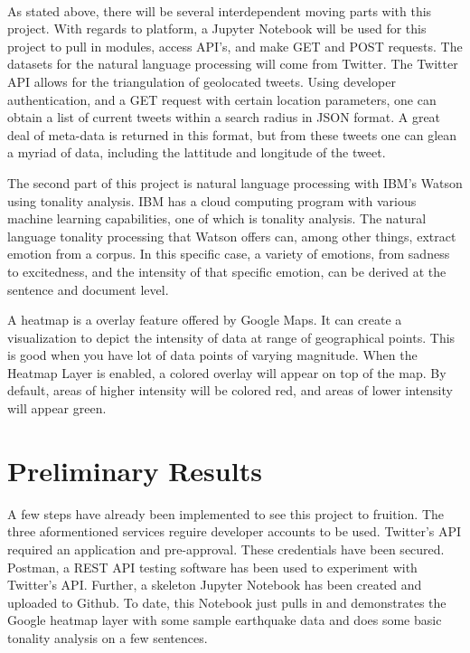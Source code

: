 \documentclass[12pt, oneside]{article}
\begin{document}
\paragraph{}
As stated above, there will be several interdependent moving parts with this
project. With regards to platform, a Jupyter Notebook will be used for this
project to pull in modules, access API's, and make GET and POST requests.
The datasets for the natural language processing will come from Twitter. The
Twitter API allows for the triangulation of geolocated tweets\cite{TwitterGeo}.
Using developer authentication, and a GET request with certain location
parameters, one can obtain a list of current tweets within a search radius in
JSON format. A great deal of meta-data is returned in this format, but from
these tweets one can glean a myriad of data, including the lattitude and
longitude of the tweet.

The second part of this project is natural language processing with IBM's
Watson using tonality analysis.
IBM has a cloud computing program with various machine learning
capabilities\cite{IBM}, one of which is tonality analysis. The natural language
tonality processing that Watson offers can, among other things, extract emotion
from a corpus. In this specific case, a variety of emotions, from
sadness to excitedness, and the intensity of that specific emotion, can be
derived at the sentence and document level.

A heatmap is a overlay feature offered by Google Maps. It can create a
visualization to depict the intensity of data at range of geographical points.
This is good when you have lot of data points of varying magnitude. When the
Heatmap Layer is enabled, a colored overlay will appear on top of the map. By
default, areas of higher intensity will be colored red, and areas of lower
intensity will appear green\cite{Google}.

\section{Preliminary Results}
A few steps have already been implemented to see this project to fruition. The
three aformentioned services reguire developer accounts to be used.
Twitter's API required an application and pre-approval. These credentials have
been secured. Postman, a REST API testing software has been used to experiment
with Twitter's API\cite{Postman}. Further, a skeleton Jupyter Notebook has
been created and uploaded to Github\cite{Git}. To date, this Notebook just
pulls in and demonstrates the Google heatmap layer with some sample earthquake
data and does some basic tonality analysis on a few sentences.
\end{document}
